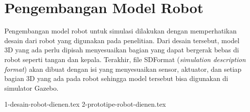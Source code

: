 \section{Pengembangan Model Robot}
\label{sec:modelrobot}

Pengembangan model robot untuk simulasi dilakukan dengan memperhatikan desain dari robot yang digunakan pada penelitian.
Dari desain tersebut, model 3D yang ada perlu dipisah menyesuaikan bagian yang dapat bergerak bebas di robot seperti tangan dan kepala.
Terakhir, file SDFormat (\emph{simulation description format}) akan dibuat dengan isi yang menyesuaikan sensor, aktuator, dan setiap bagian 3D yang ada pada robot sehingga model tersebut bisa digunakan di simulator Gazebo.

{1-desain-robot-dienen.tex}
{2-prototipe-robot-dienen.tex}
